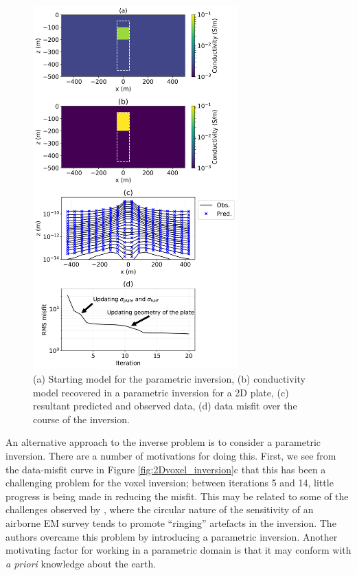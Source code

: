 \documentclass[paper]{geophysics}
\begin{document}
\begin{figure}[!htb]
  \centering
  \includegraphics[width=0.7\textwidth]{figures/2Dparametric_inversion.png}
  \caption{(a) Starting model for the parametric inversion, (b) conductivity model recovered in a parametric inversion for a 2D plate, (c) resultant predicted and observed data, (d) data misfit over the course of the inversion.}
  \label{fig:2Dparametric_inversion}
\end{figure}

An alternative approach to the inverse problem is to consider a parametric inversion. There are a number of motivations for doing this. First, we see from the data-misfit curve in Figure \ref{fig:2Dvoxel_inversion}c that this has been a challenging problem for the voxel inversion; between iterations 5 and 14, little progress is being made in reducing the misfit. This may be related to some of the challenges observed by \cite{mcmillan2015}, where the circular nature of the sensitivity of an airborne EM survey tends  to promote ``ringing'' artefacts in the inversion. The authors overcame this problem by introducing a parametric inversion. Another motivating factor for working in a parametric domain is that it may conform with \emph{a priori} knowledge about the earth.
\end{document}
